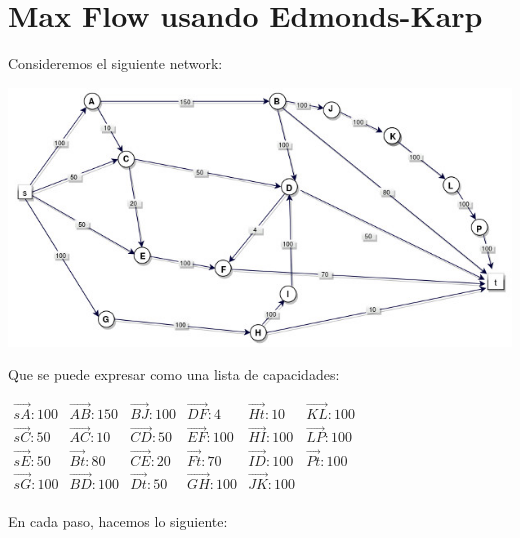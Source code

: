 \documentclass[10pt,a4paper]{article}
\begin{document}
\section*{Max Flow usando Edmonds-Karp}

Consideremos el siguiente network:

\begin{center}

    \begin{adjustbox}{max size={\textwidth}{\textheight}}
        \includegraphics{definitions/EK1.jpg}
        \end{adjustbox}
    
\end{center}

Que se puede expresar como una lista de capacidades:

\begin{center}
$\begin{array}{llllll} \overrightarrow{sA}: 100& \overrightarrow{AB}: 150&\overrightarrow{BJ}: 100&\overrightarrow{DF}: 4&\overrightarrow{Ht}: 10&\overrightarrow{KL}: 100\\ \overrightarrow{sC}: 50& \overrightarrow{AC}: 10&\overrightarrow{CD}: 50&\overrightarrow{EF}: 100&\overrightarrow{HI}: 100&\overrightarrow{LP}: 100\\ \overrightarrow{sE}: 50& \overrightarrow{Bt}: 80&\overrightarrow{CE}: 20&\overrightarrow{Ft}: 70&\overrightarrow{ID}: 100&\overrightarrow{Pt}: 100\\ \overrightarrow{sG}: 100& \overrightarrow{BD}: 100&\overrightarrow{Dt}: 50&\overrightarrow{GH}: 100&\overrightarrow{JK}: 100&\\ \end{array}$
\end{center}

En cada paso, hacemos lo siguiente:
\end{document}
